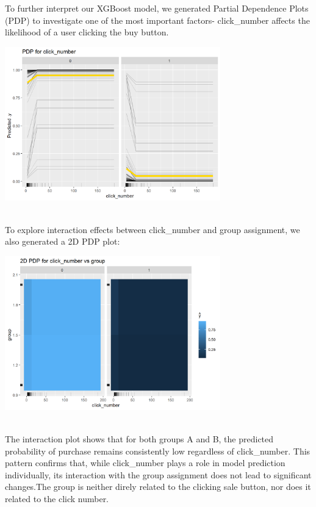 \documentclass[
  letterpaper,
  DIV=11,
  numbers=noendperiod]{scrartcl}
\begin{document}
To further interpret our XGBoost model, we generated Partial Dependence
Plots (PDP) to investigate one of the most important factors-
click\_number affects the likelihood of a user clicking the buy
button.\\
\begin{center}
\includegraphics[width=0.7\textwidth,height=\textheight]{data_ana_pj3_files/figure-html/unnamed-chunk-9-1.png}
\end{center}
\\
To explore interaction effects between click\_number and group
assignment, we also generated a 2D PDP plot: \begin{center}
\includegraphics[width=0.7\textwidth,height=\textheight]{data_ana_pj3_files/figure-html/unnamed-chunk-9-2.png}
\end{center}
\\
The interaction plot shows that for both groups A and B, the predicted
probability of purchase remains consistently low regardless of
click\_number. This pattern confirms that, while click\_number plays a
role in model prediction individually, its interaction with the group
assignment does not lead to significant changes.The group is neither
direly related to the clicking sale button, nor does it related to the
click number.\\
\end{document}
